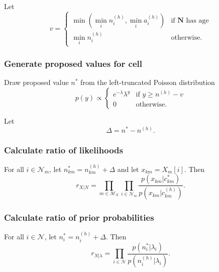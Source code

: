 \documentclass{article}
\begin{document}
Let
\begin{equation}
    v =
      \begin{cases}
          \min \left( \min_i n_i^{(h)}, \min_i a_i^{(h)} \right) & \text{if } \bm{N} \text{ has age} \\
          \min_i n_i^{(h)} & \text{otherwise}.
      \end{cases}
\end{equation}


\subsubsection{Generate proposed values for cell}

Draw proposed value $n^*$ from the left-truncated Poisson distribution 
    \begin{equation}
       p(y) \propto
       \begin{cases}
          e^{-\lambda} \lambda^y & \text{if } y \geq n^{(h)} - v \\
          0 & \text{otherwise.} 
      \end{cases}
    \end{equation}

Let
\begin{equation}
  \Delta = n^* - n^{(h)}.
\end{equation}

\subsubsection{Calculate ratio of likelihoods}

For all $i \in \mathcal{N}_m$, let $n_{km}^* =n_{km}^{(h)} + \Delta$ and let $x_{km} = X_m[i]$.  Then
\begin{equation}
  r_{X|N} = \prod_{m \in \mathcal{M}_X} \prod_{i \in \mathcal{N}_m} \frac{ p(x_{km} | c_{km}^*) }{ p(x_{km} | c_{km}^{(h)}) }.
\end{equation}


\subsubsection{Calculate ratio of prior probabilities}

For all $i \in \mathcal{N}$, let $n_i^* =n_i^{(h)} + \Delta$. Then
\begin{equation}
  r_{N|\lambda} =  \prod_{i \in \mathcal{N}} \frac{ p(n_i^* | \lambda_i) }{ p(n_i^{(h)} | \lambda_i) }.
\end{equation}
\end{document}
